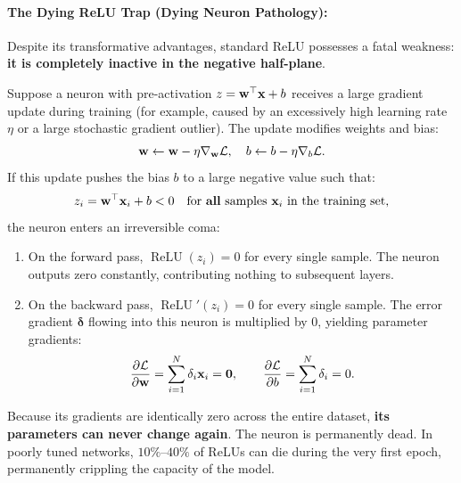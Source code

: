 \paragraph{The Dying ReLU Trap (Dying Neuron Pathology):}
Despite its transformative advantages, standard ReLU possesses a fatal weakness: \textbf{it is completely inactive in the negative half-plane}.

Suppose a neuron with pre-activation $z = \mathbf{w}^\top \mathbf{x} + b$ receives a large gradient update during training (for example, caused by an excessively high learning rate $\eta$ or a large stochastic gradient outlier). The update modifies weights and bias:
\begin{equation}
\mathbf{w} \leftarrow \mathbf{w} - \eta \nabla_{\mathbf{w}} \mathcal{L}, \quad b \leftarrow b - \eta \nabla_b \mathcal{L}.
\end{equation}
If this update pushes the bias $b$ to a large negative value such that:
\begin{equation}
z_i = \mathbf{w}^\top \mathbf{x}_i + b < 0 \quad \text{for \textbf{all} samples } \mathbf{x}_i \text{ in the training set},
\label{eq:dying_relu_condition}
\end{equation}
the neuron enters an irreversible coma:
\begin{enumerate}[noitemsep,topsep=2pt,parsep=0pt,partopsep=0pt]
  \item On the forward pass, $\operatorname{ReLU}(z_i) = 0$ for every single sample. The neuron outputs zero constantly, contributing nothing to subsequent layers.
  \item On the backward pass, $\operatorname{ReLU}'(z_i) = 0$ for every single sample. The error gradient $\boldsymbol{\delta}$ flowing into this neuron is multiplied by 0, yielding parameter gradients:
    \begin{equation}
    \frac{\partial \mathcal{L}}{\partial \mathbf{w}} = \sum_{i=1}^N \delta_i \mathbf{x}_i = \mathbf{0}, \qquad \frac{\partial \mathcal{L}}{\partial b} = \sum_{i=1}^N \delta_i = 0.
    \end{equation}
\end{enumerate}
Because its gradients are identically zero across the entire dataset, \textbf{its parameters can never change again}. The neuron is permanently dead. In poorly tuned networks, $10\%$--$40\%$ of ReLUs can die during the very first epoch, permanently crippling the capacity of the model.


